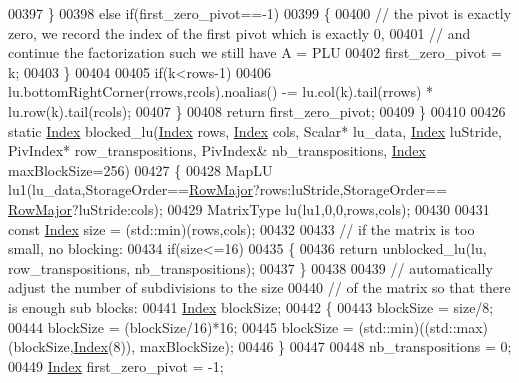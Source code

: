 \begin{DoxyCode}
00397       \}
00398       \textcolor{keywordflow}{else} \textcolor{keywordflow}{if}(first\_zero\_pivot==-1)
00399       \{
00400         \textcolor{comment}{// the pivot is exactly zero, we record the index of the first pivot which is exactly 0,}
00401         \textcolor{comment}{// and continue the factorization such we still have A = PLU}
00402         first\_zero\_pivot = k;
00403       \}
00404 
00405       \textcolor{keywordflow}{if}(k<rows-1)
00406         lu.bottomRightCorner(rrows,rcols).noalias() -= lu.col(k).tail(rrows) * lu.row(k).tail(rcols);
00407     \}
00408     \textcolor{keywordflow}{return} first\_zero\_pivot;
00409   \}
00410 
00426   \textcolor{keyword}{static} \hyperlink{group___core___module_a554f30542cc2316add4b1ea0a492ff02}{Index} blocked\_lu(\hyperlink{group___core___module_a554f30542cc2316add4b1ea0a492ff02}{Index} rows, \hyperlink{group___core___module_a554f30542cc2316add4b1ea0a492ff02}{Index} cols, Scalar* lu\_data, 
      \hyperlink{group___core___module_a554f30542cc2316add4b1ea0a492ff02}{Index} luStride, PivIndex* row\_transpositions, PivIndex& nb\_transpositions, 
      \hyperlink{group___core___module_a554f30542cc2316add4b1ea0a492ff02}{Index} maxBlockSize=256)
00427   \{
00428     MapLU lu1(lu\_data,StorageOrder==\hyperlink{group__enums_ggaacded1a18ae58b0f554751f6cdf9eb13acfcde9cd8677c5f7caf6bd603666aae3}{RowMajor}?rows:luStride,StorageOrder==
      \hyperlink{group__enums_ggaacded1a18ae58b0f554751f6cdf9eb13acfcde9cd8677c5f7caf6bd603666aae3}{RowMajor}?luStride:cols);
00429     MatrixType lu(lu1,0,0,rows,cols);
00430 
00431     \textcolor{keyword}{const} \hyperlink{group___core___module_a554f30542cc2316add4b1ea0a492ff02}{Index} size = (std::min)(rows,cols);
00432 
00433     \textcolor{comment}{// if the matrix is too small, no blocking:}
00434     \textcolor{keywordflow}{if}(size<=16)
00435     \{
00436       \textcolor{keywordflow}{return} unblocked\_lu(lu, row\_transpositions, nb\_transpositions);
00437     \}
00438 
00439     \textcolor{comment}{// automatically adjust the number of subdivisions to the size}
00440     \textcolor{comment}{// of the matrix so that there is enough sub blocks:}
00441     \hyperlink{group___core___module_a554f30542cc2316add4b1ea0a492ff02}{Index} blockSize;
00442     \{
00443       blockSize = size/8;
00444       blockSize = (blockSize/16)*16;
00445       blockSize = (std::min)((std::max)(blockSize,\hyperlink{namespace_eigen_a62e77e0933482dafde8fe197d9a2cfde}{Index}(8)), maxBlockSize);
00446     \}
00447 
00448     nb\_transpositions = 0;
00449     \hyperlink{group___core___module_a554f30542cc2316add4b1ea0a492ff02}{Index} first\_zero\_pivot = -1;

\end{DoxyCode}
